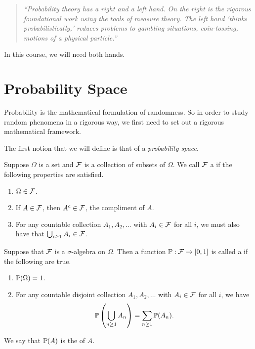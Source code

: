 \documentclass[a4paper]{scrreprt}
\begin{document}
\begin{quote}
	\emph{``Probability theory has a right and a left hand. On the right is the rigorous foundational work using the tools of measure theory. The left hand `thinks probabilistically,' reduces problems to gambling situations, coin-tossing, motions of a physical particle.''}
\end{quote}

In this course, we will need both hands.

\section{Probability Space}


Probability is the mathematical formulation of randomness. So in order to study random phenomena in a rigorous way, we first need to set out a rigorous mathematical framework. 

The first notion that we will define is that of a \emph{probability space}.

\begin{definition}
Suppose $\Omega$ is a set and $\mathcal{F}$ is a collection of subsets of $\Omega$. We call $\mathcal{F}$ a  if the following properties are satisfied.
\begin{enumerate}[label=(\roman*)]
	\item $\Omega \in \mathcal{F}$.
	\item If $A \in \mathcal{F}$, then $A^c \in \mathcal{F}$, the compliment of $A$.
	\item For any countable collection $A_1, A_2, \dots$ with $A_i \in \mathcal{F}$ for all $i$, we must also have that $\bigcup_{i \geq 1} A_i \in \mathcal{F}$.
\end{enumerate}
\end{definition}

\begin{definition}
	Suppose that $\mathcal{F}$ is a $\sigma$-algebra on $\Omega$. Then a function $\mathbb{P} : \mathcal{F} \rightarrow [0, 1]$	is called a  if the following are true.
	\begin{enumerate}[label=(\roman*)]
		\item $\mathbb{P}(\Omega) = 1$.
		\item For any countable disjoint collection $A_1, A_2, \dots$ with $A_i \in \mathcal{F}$ for all $i$, we have
		$$
		\mathbb{P}\left(\bigcup_{n \geq 1} A_n\right) = \sum_{n \geq 1} \mathbb{P} (A_n).
		$$
	\end{enumerate}
	We say that $\mathbb{P}(A)$ is the  of $A$.
\end{definition}
\end{document}
